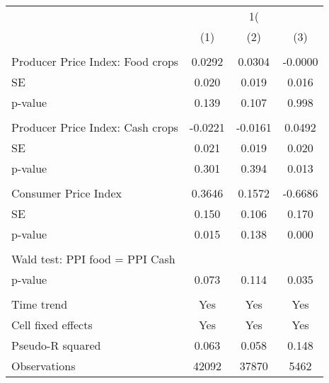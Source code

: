 {
\def\sym#1{\ifmmode^{#1}\else\(^{#1}\)\fi}
\begin{tabular}{l*{3}{c}}
\hline\hline
                    &&&\\\cmidrule(lr){2-2}\cmidrule(lr){3-3}\cmidrule(lr){4-4}
                    &         &         &         \\
\hline
\hline
\\ Producer Price Index: Food crops&      0.0292         &      0.0304         &     -0.0000         \\
\hspace{15pt} SE    &       0.020         &       0.019         &       0.016         \\
\hspace{15pt} p-value&       0.139         &       0.107         &       0.998         \\
\\ Producer Price Index: Cash crops&     -0.0221         &     -0.0161         &      0.0492         \\
\hspace{15pt} SE    &       0.021         &       0.019         &       0.020         \\
\hspace{15pt} p-value&       0.301         &       0.394         &       0.013         \\
\\ Consumer Price Index&      0.3646         &      0.1572         &     -0.6686         \\
\hspace{15pt} SE    &       0.150         &       0.106         &       0.170         \\
\hspace{15pt} p-value&       0.015         &       0.138         &       0.000         \\
\hline \\  Wald test: PPI food = PPI Cash&                     &                     &                     \\
\hspace{15pt} p-value&       0.073         &       0.114         &       0.035         \\
\hline \\ Time trend&         Yes         &         Yes         &         Yes         \\
Cell fixed effects  &         Yes         &         Yes         &         Yes         \\
Pseudo-R squared    &       0.063         &       0.058         &       0.148         \\
Observations        &       42092         &       37870         &        5462         \\
\hline\hline
\end{tabular}
}
